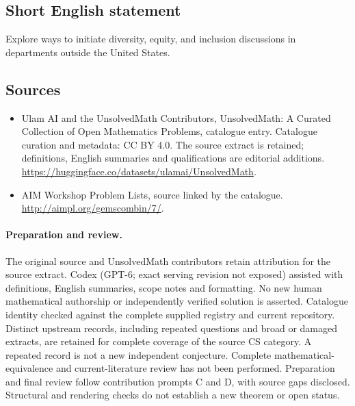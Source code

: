 \documentclass[11pt]{article}
\begin{document}
\subsection{Short English statement}
Explore ways to initiate diversity, equity, and inclusion discussions in departments outside the United States.
\subsection{Sources}
\begin{itemize}
\item[\hypertarget{source:statement:1}{S1}] Ulam AI and the UnsolvedMath Contributors, UnsolvedMath: A Curated Collection of Open Mathematics Problems, catalogue entry. Catalogue curation and metadata: CC BY 4.0. The source extract is retained; definitions, English summaries and qualifications are editorial additions.
\url{https://huggingface.co/datasets/ulamai/UnsolvedMath}.
\item[\hypertarget{source:statement:2}{S2}] AIM Workshop Problem Lists, source linked by the catalogue.
\url{http://aimpl.org/gemscombin/7/}.
\end{itemize}
\paragraph{Preparation and review.}
The original source and UnsolvedMath contributors retain attribution for the source extract. Codex (GPT-6; exact serving revision not exposed) assisted with definitions, English summaries, scope notes and formatting. No new human mathematical authorship or independently verified solution is asserted. Catalogue identity checked against the complete supplied registry and current repository. Distinct upstream records, including repeated questions and broad or damaged extracts, are retained for complete coverage of the source CS category. A repeated record is not a new independent conjecture. Complete mathematical-equivalence and current-literature review has not been performed. Preparation and final review follow contribution prompts C and D, with source gaps disclosed. Structural and rendering checks do not establish a new theorem or open status.
\label{end:statement}
\end{document}
